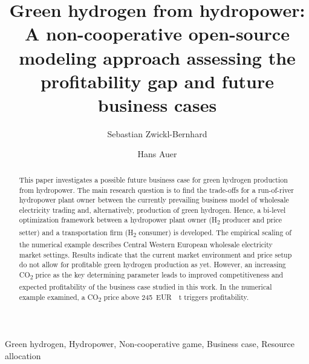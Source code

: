 \documentclass[review]{elsarticle}
\begin{document}
\begin{frontmatter}

\title{Green hydrogen from hydropower: A non-cooperative open-source modeling approach assessing the profitability gap and future business cases}
\author[1]{Sebastian Zwickl-Bernhard}
\author[1]{Hans Auer}
\address[1]{Energy Economics Group (EEG), Technische Universität Wien, Gusshausstrasse 25-29/E370-3, 1040 Wien, Austria}


\begin{abstract}
This paper investigates a possible future business case for green hydrogen production from hydropower. The main research question is to find the trade-offs for a run-of-river hydropower plant owner between the currently prevailing business model of wholesale electricity trading and, alternatively, production of green hydrogen. Hence, a bi-level optimization framework between a hydropower plant owner (H\textsubscript{2} producer and price setter) and a transportation firm (H\textsubscript{2} consumer) is developed. The empirical scaling of the numerical example describes Central Western European wholesale electricity market settings. Results indicate that the current market environment and price setup do not allow for profitable green hydrogen production as yet. However, an increasing CO\textsubscript{2} price as the key determining parameter leads to improved competitiveness and expected profitability of the business case studied in this work. In the numerical example examined, a CO\textsubscript{2} price above \SI{245}{EUR \per \tonne} triggers profitability.
\end{abstract}


\begin{keyword}
Green hydrogen, Hydropower, Non-cooperative game, Business case, Resource allocation
\end{keyword}

\end{frontmatter}
\newpage
\end{document}
